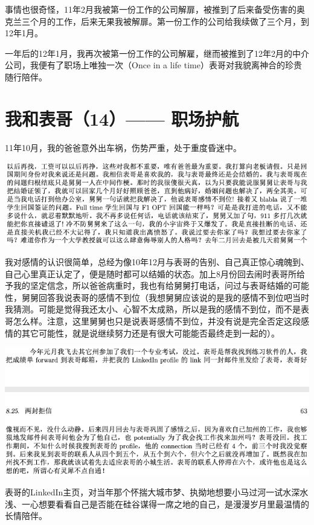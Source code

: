 \documentclass[9pt, b5paper]{article}
\begin{document}
事情也很奇怪，11年2月我被第一份工作的公司解扉，被推到了后来备受伤害的奥克兰三个月的工作，后来无果我被解扉。第一份工作的公司给我续做了三个月，到12年1月。

一年后的12年1月，我再次被第一份工作的公司解雇，继而被推到了12年2月的中介公司，我便有了职场上唯独一次（Once in a life time）表哥对我貌离神合的珍贵随行陪伴。

\section{我和表哥（14）—— 职场护航}
\label{sec:orgda59377}

11年10月，我的爸爸意外出车祸，伤势严重，处于重度昏迷中。 

\begin{center}
\includegraphics[width=.9\linewidth]{./pic/p1p76.png}
\end{center}

我对感情的认识很简单，总经为像10年12月与表哥的告别、自己真正惊心魂魄到、自己心里真正认定了，便是随时都可以结婚的状态。加上8月份回去闹时表哥所给予我的坚定信念，所以爸爸病重时，我也有给舅舅打电话，问过与表哥结婚的可能性，舅舅回答我说表哥的感情不到位（我想舅舅应该说的是我的感情不到位吧当时我猜测。可能是觉得我还太小、心智不太成熟，所以是我的感情不到位，而不是表哥怎么样。注意，这里舅舅也只是说表哥感情不到位，并没有说是完全否定这段感情的其它可能性，就是说继续努力还是有很大可能能否最终走到一起的）。

\begin{center}
\includegraphics[width=.9\linewidth]{./pic/p1p63-1.png}
\end{center}

表哥的LinkedIn主页，对当年那个怀揣大城市梦、执拗地想要小马过河一试水深水浅、一心想要看看自己是否能在硅谷谋得一席之地的自己，是漫漫岁月里最温情的长情陪伴。
\end{document}
